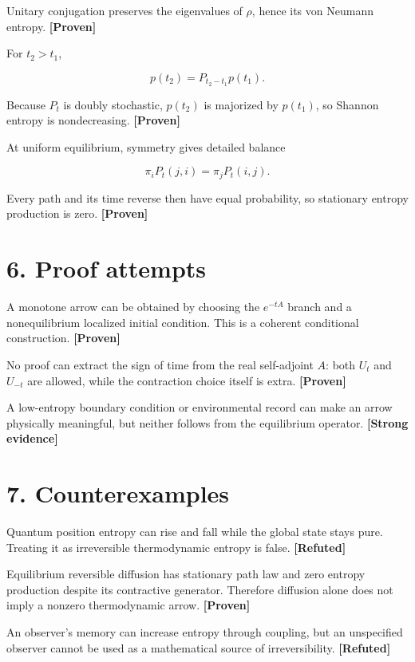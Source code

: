 \documentclass[11pt,a4paper,openany]{report}
\newcommand{\statusProven}{\textcolor{fingreen}{[Proven]}}
\newcommand{\statusStrong}{\textcolor{finblue}{[Strong evidence]}}
\newcommand{\statusRefuted}{\textcolor{finred}{[Refuted]}}
\begin{document}
Unitary conjugation preserves the eigenvalues of \(\rho\), hence its von Neumann entropy. \textbf{\statusProven{}}

For \(t_2>t_1\),

\[
p(t_2)=P_{t_2-t_1}p(t_1).
\]

Because \(P_t\) is doubly stochastic, \(p(t_2)\) is majorized by \(p(t_1)\), so Shannon entropy is nondecreasing. \textbf{\statusProven{}}

At uniform equilibrium, symmetry gives detailed balance

\[
\pi_iP_t(j,i)=\pi_jP_t(i,j).
\]

Every path and its time reverse then have equal probability, so stationary entropy production is zero. \textbf{\statusProven{}}

\section{6. Proof attempts}

A monotone arrow can be obtained by choosing the \(e^{-tA}\) branch and a nonequilibrium localized initial condition. This is a coherent conditional construction. \textbf{\statusProven{}}

No proof can extract the sign of time from the real self-adjoint \(A\): both \(U_t\) and \(U_{-t}\) are allowed, while the contraction choice itself is extra. \textbf{\statusProven{}}

A low-entropy boundary condition or environmental record can make an arrow physically meaningful, but neither follows from the equilibrium operator. \textbf{\statusStrong{}}

\section{7. Counterexamples}

Quantum position entropy can rise and fall while the global state stays pure. Treating it as irreversible thermodynamic entropy is false. \textbf{\statusRefuted{}}

Equilibrium reversible diffusion has stationary path law and zero entropy production despite its contractive generator. Therefore diffusion alone does not imply a nonzero thermodynamic arrow. \textbf{\statusProven{}}

An observer's memory can increase entropy through coupling, but an unspecified observer cannot be used as a mathematical source of irreversibility. \textbf{\statusRefuted{}}
\end{document}
